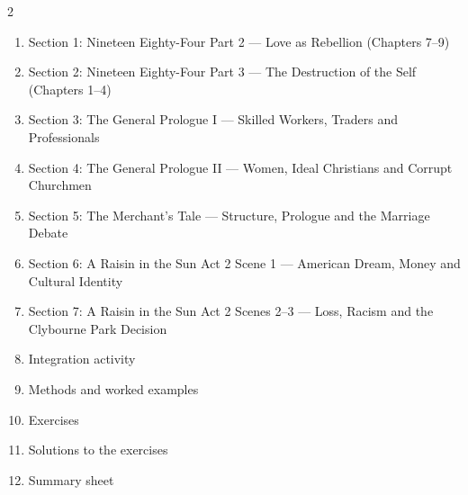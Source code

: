 \documentclass[11pt]{article}
\begin{document}
\begin{sommaire}
\begin{multicols}{2}
\begin{enumerate}
\item Section 1: Nineteen Eighty-Four Part 2 — Love as Rebellion (Chapters 7–9)
\item Section 2: Nineteen Eighty-Four Part 3 — The Destruction of the Self (Chapters 1–4)
\item Section 3: The General Prologue I — Skilled Workers, Traders and Professionals
\item Section 4: The General Prologue II — Women, Ideal Christians and Corrupt Churchmen
\item Section 5: The Merchant's Tale — Structure, Prologue and the Marriage Debate
\item Section 6: A Raisin in the Sun Act 2 Scene 1 — American Dream, Money and Cultural Identity
\item Section 7: A Raisin in the Sun Act 2 Scenes 2–3 — Loss, Racism and the Clybourne Park Decision
\item Integration activity
\item Methods and worked examples
\item Exercises
\item Solutions to the exercises
\item Summary sheet
\end{enumerate}
\end{multicols}
\end{sommaire}
\end{document}
